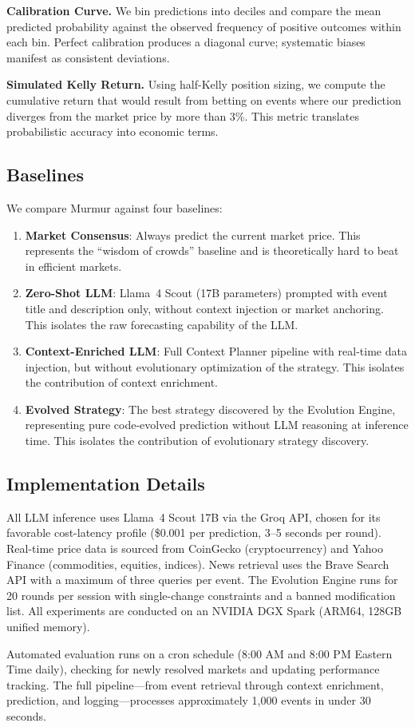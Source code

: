 \textbf{Calibration Curve.} We bin predictions into deciles and compare the mean predicted probability against the observed frequency of positive outcomes within each bin. Perfect calibration produces a diagonal curve; systematic biases manifest as consistent deviations.

\textbf{Simulated Kelly Return.} Using half-Kelly position sizing, we compute the cumulative return that would result from betting on events where our prediction diverges from the market price by more than 3\%. This metric translates probabilistic accuracy into economic terms.

\subsection{Baselines}

We compare Murmur against four baselines:

\begin{enumerate}
    \item \textbf{Market Consensus}: Always predict the current market price. This represents the ``wisdom of crowds'' baseline and is theoretically hard to beat in efficient markets.
    \item \textbf{Zero-Shot LLM}: Llama~4 Scout (17B parameters) prompted with event title and description only, without context injection or market anchoring. This isolates the raw forecasting capability of the LLM.
    \item \textbf{Context-Enriched LLM}: Full Context Planner pipeline with real-time data injection, but without evolutionary optimization of the strategy. This isolates the contribution of context enrichment.
    \item \textbf{Evolved Strategy}: The best strategy discovered by the Evolution Engine, representing pure code-evolved prediction without LLM reasoning at inference time. This isolates the contribution of evolutionary strategy discovery.
\end{enumerate}

\subsection{Implementation Details}

All LLM inference uses Llama~4 Scout 17B via the Groq API, chosen for its favorable cost-latency profile (\$0.001 per prediction, 3--5 seconds per round). Real-time price data is sourced from CoinGecko (cryptocurrency) and Yahoo Finance (commodities, equities, indices). News retrieval uses the Brave Search API with a maximum of three queries per event. The Evolution Engine runs for 20 rounds per session with single-change constraints and a banned modification list. All experiments are conducted on an NVIDIA DGX Spark (ARM64, 128GB unified memory).

Automated evaluation runs on a cron schedule (8:00 AM and 8:00 PM Eastern Time daily), checking for newly resolved markets and updating performance tracking. The full pipeline---from event retrieval through context enrichment, prediction, and logging---processes approximately 1{,}000 events in under 30 seconds.
